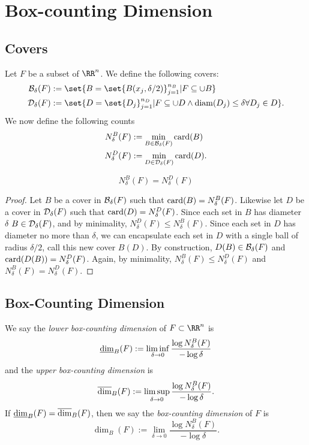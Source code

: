 
\chapter{Box-counting Dimension}

\section{Covers}

Let $F$ be a subset of $\RR^n$.
We define the following covers:
\begin{align*}
	\mcb_\delta(F)&:=\set{B=\set{B(x_j,\delta/2)}_{j=1}^{n_B}| F\subseteq \cup B}\\
	\mcd_\delta(F)&:=\set{D=\set{D_j}_{j=1}^{n_D}| F\subseteq \cup D \wedge\diam (D_j)\leq\delta\forall D_j\in D}.
\end{align*}
We now define the following counts
\begin{align*}
	N^B_\delta(F)&:=\min\limits_{B\in\mathcal{B}_\delta(F)}\operatorname{card}(B)\\
	N^D_\delta(F)&:=\min\limits_{D\in\mathcal{D}_\delta(F)}\operatorname{card}(D).
\end{align*}

\begin{thm}
	\[
		N^B_\delta(F)=N^D_\delta(F)
	\]
\end{thm}
\begin{proof}
	Let $B$ be a cover in $\mathcal{B}_\delta(F)$ such that $\operatorname{card}(B)=N^B_\delta(F)$.
	Likewise let $D$ be a cover in $\mathcal{D}_\delta(F)$ such that $\operatorname{card}(D)=N^D_\delta(F)$.
	Since each set in $B$ has diameter $\delta$ $B\in\mathcal{D}_\delta(F)$, and by minimality, $N^D_\delta(F)\leq N^B_\delta(F)$.
	Since each set in $D$ has diameter no more than $\delta$, we can encapsulate each set in $D$ with a single ball of radius $\delta/2$, call this new cover $B(D)$.
	By construction, $D(B)\in\mathcal{B}_\delta(F)$ and $\operatorname{card}(D(B))=N^D_\delta(F)$.
	Again, by minimality, $N^B_\delta(F)\leq N^D_\delta(F)$ and $N^B_\delta(F) = N^D_\delta(F)$.
\end{proof}

\section{Box-Counting Dimension}

\begin{definition}
	We say the \textit{lower box-counting dimension} of $F\subset\RR^n$ is
	\[
		\underline{\operatorname{dim}}_B(F):=\liminf\limits_{\delta\rightarrow 0} \frac{\log N^B_\delta(F)}{-\log\delta}
	\]
	and the \textit{upper box-counting dimension} is
	\[
		\overline{\operatorname{dim}}_B(F):=\limsup\limits_{\delta\rightarrow 0} \frac{\log N^B_\delta(F)}{-\log\delta}.
	\]
	If $\underline{\operatorname{dim}}_B(F)=\overline{\operatorname{dim}}_B(F)$, then we say the \textit{box-counting dimension} of $F$ is
	\[
		\dim_B(F):=\lim\limits_{\delta\rightarrow 0} \frac{\log N^B_\delta(F)}{-\log\delta}.
	\]
\end{definition}

